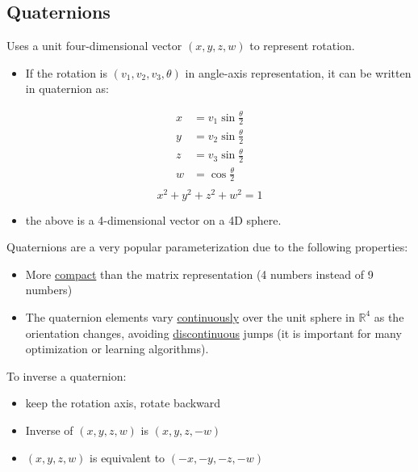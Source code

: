 \documentclass[10pt]{article}
\begin{document}
\subsection*{Quaternions}
Uses a unit four-dimensional vector $(x, y, z, w)$ to represent rotation.
\begin{itemize}
	\item If the rotation is $(v_1, v_2, v_3, \theta)$ in angle-axis representation, it can be written in quaternion as:
\end{itemize}
\begin{align*}
    x &= v_1 \sin \frac{\theta}{2}\\
    y &= v_2 \sin \frac{\theta}{2}\\
    z &= v_3 \sin \frac{\theta}{2}\\
    w &= \cos \frac{\theta}{2}\\
\end{align*}
\[x^2 + y^2 + z^2 + w^2 = 1\]
\begin{itemize}
	\item the above is a 4-dimensional vector on a 4D sphere.
\end{itemize}
Quaternions are a very popular parameterization due to the following properties:
\begin{itemize}
	\item More \underline{compact} than the matrix representation (4 numbers instead of 9 numbers)
	\item The quaternion elements vary \underline{continuously} over the unit sphere in $\mathbb{R}^4$ as the orientation changes, avoiding \underline{discontinuous} jumps (it is important for many optimization or learning algorithms).
\end{itemize}
To inverse a quaternion:
\begin{itemize}
	\item keep the rotation axis, rotate backward
	\item Inverse of $(x, y, z, w)$ is $(x, y, z, -w)$
	\item $(x, y, z, w)$ is equivalent to $(-x, -y, -z, -w)$
\end{itemize}
\end{document}
